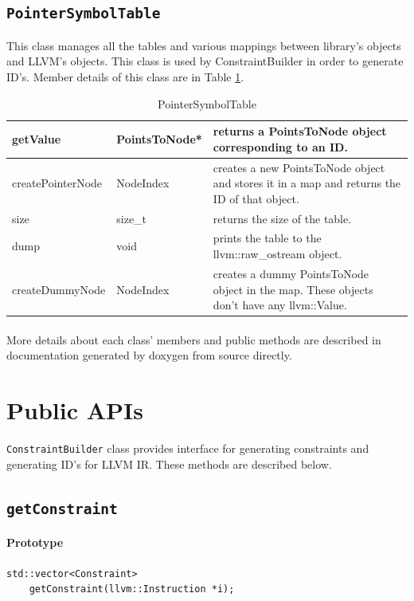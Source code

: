 \documentclass[a4paper,12pt]{report}
\begin{document}
\subsection{\texttt{PointerSymbolTable}}
This class manages all the tables and various mappings between library's 
objects and LLVM's objects. This class is used by ConstraintBuilder in order to 
generate ID's. Member details of this class are in Table \ref{pointer-symbol-table}.

\begin{table}[]
\centering
\caption{PointerSymbolTable}
\label{pointer-symbol-table}
\begin{tabular}{|l|l|p{8cm}|}
\hline
getValue & PointsToNode* & returns a PointsToNode object corresponding to an ID. \\ \hline
createPointerNode & NodeIndex & creates a new PointsToNode object and stores it in a map and returns the ID of that object. \\ \hline
size & size\_t & returns the size of the table. \\ \hline
dump & void & prints the table to the llvm::raw\_ostream object. \\ \hline
createDummyNode & NodeIndex & creates a dummy PointsToNode object in the map. These objects don't have any llvm::Value. \\ \hline

\end{tabular}
\end{table}

\paragraph{}
More details about each class' members and public methods are described in 
documentation generated by doxygen from source directly.

\section{Public APIs}
\texttt{ConstraintBuilder} class provides interface for generating constraints
and generating ID's for LLVM IR. These methods are described below.

\subsection{\texttt{getConstraint}}
\paragraph{Prototype}
\begin{verbatim}
std::vector<Constraint>
    getConstraint(llvm::Instruction *i);
\end{verbatim}
\end{document}
